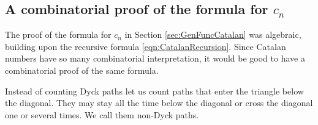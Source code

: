 

\setcounter{section}{4}
\setcounter{subsection}{6}
\setcounter{dfn}{9}

\subsection{A combinatorial proof of the formula for $c_n$}
The proof of the formula for $c_n$ in Section \ref{sec:GenFuncCatalan} was algebraic,
building upon the recursive formula \eqref{eqn:CatalanRecursion}.
Since Catalan numbers have so many combinatorial interpretation, it would be good to have a combinatorial proof of the same formula.

Instead of counting Dyck paths let us count paths that enter the triangle below the diagonal.
They may stay all the time below the diagonal or cross the diagonal one or several times.
We call them non-Dyck paths.

